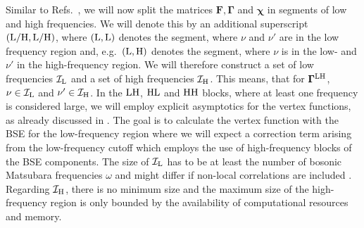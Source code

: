 \documentclass[../../main.tex]{subfiles}
\begin{document}
Similar to Refs.~\cite{Kunes2011, Hummel2014, Tagliavini2018}, we will now split the matrices $\bm{F}, \bm{\Gamma}$ and $\bm{\chi}$ in segments of low and high frequencies. We will denote this by an additional superscript $(\text{L}/\text{H}, \text{L}/\text{H})$, where $(\text{L},\text{L})$ denotes the segment, where $\nu$ and $\nu'$ are in the low frequency region and, e.g.\ $(\text{L},\text{H})$ denotes the segment, where $\nu$ is in the low- and $\nu'$ in the high-frequency region. We will therefore construct a set of low frequencies $\mathcal{I}_{\text{L}}$ and a set of high frequencies $\mathcal{I}_{\text{H}}$. This means, that for $\bm\Gamma^{\text{L}\text{H}}$, $\nu\in\mathcal{I}_{\text{L}}$ and $\nu'\in\mathcal{I}_{\text{H}}$. In the $\text{L}\text{H}$, $\text{H}\text{L}$ and $\text{H}\text{H}$ blocks, where at least one frequency is considered large, we will employ explicit asymptotics for the vertex functions, as already discussed in . The goal is to calculate the vertex function with the BSE for the low-frequency region where we will expect a correction term arising from the low-frequency cutoff which employs the use of high-frequency blocks of the BSE components. The size of $\mathcal{I}_{\text{L}}$ has to be at least the number of bosonic Matsubara frequencies $\omega$ \cite{Tagliavini2018} and might differ if non-local correlations are included \cite{Kinza2013}. Regarding $\mathcal{I}_{\text{H}}$, there is no minimum size and the maximum size of the high-frequency region is only bounded by the availability of computational resources and memory. 
\end{document}
